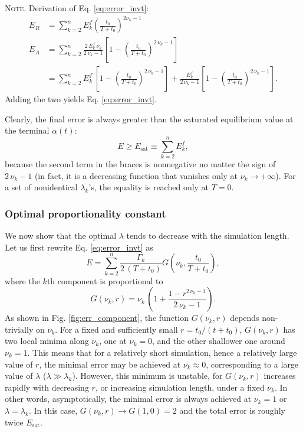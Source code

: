 \documentclass[reprint, floatfix]{revtex4-1}
\newcommand{\note}[1]{{\color{DarkGreen}\footnotesize \textsc{Note.} #1}}
\newcommand{\Err}{E}
\begin{document}
\note{Derivation of Eq. \eqref{eq:error_invt}:
$$
\begin{aligned}
\Err_R
&=
\sum_{ k = 2 }^n
  \Err^f_k \left( \frac{   t_0   }
                       { T + t_0 }
          \right)^{ 2 \nu_k - 1 }
\\
\Err_A
&=
\sum_{ k = 2 }^n
  \frac{ 2 \, \Err^f_k \, \nu_k }
       {    2 \, \nu_k - 1      }
  \left[
    1 -
    \left(
      \tfrac{   t_0   }
            { T + t_0 }
      \right)^{2 \, \nu_k - 1}
  \right]
\\
&=
\sum_{ k = 2 }^n
  \Err^f_k \,
  \left[
    1 -
    \left(
      \tfrac{   t_0   }
            { T + t_0 }
      \right)^{2 \, \nu_k - 1}
  \right]
  +
  \frac{   \Err^f_k     }
       { 2 \, \nu_k - 1 }
  \left[
    1 -
    \left(
      \tfrac{   t_0   }
           { T + t_0 }
      \right)^{2 \, \nu_k - 1}
  \right].
\end{aligned}
$$
Adding the two yields Eq. \eqref{eq:error_invt}.
}



%

Clearly, the final error is always greater than
the saturated equilibrium value at the terminal $\alpha(t)$:
$$
E \ge E_\mathrm{sat} \equiv \sum_{k = 2}^n E^f_k,
$$
because the second term in the braces
is nonnegative no matter the sign of $2 \, \nu_k - 1$
(in fact, it is a decreasing function
that vanishes only at $\nu_k \to +\infty$).
%
For a set of nonidentical $\lambda_k$'s,
the equality is reached only at $T = 0$.



\subsubsection{\label{sec:optlambda}
Optimal proportionality constant}



We now show that the optimal $\lambda$
tends to decrease with the simulation length.
%
Let us first rewrite Eq. \eqref{eq:error_invt} as
%
$$
\Err
=
\sum_{ k = 2 }^n
  \frac{    \Gamma_k    }
       { 2 \, (T + t_0) }
  G\left( \nu_k, \frac{ t_0 } { T + t_0} \right),
$$
%
where the $k$th component is proportional to
%
$$
G\left( \nu_k, r \right)
=
\nu_k
\,
\left(
  1
  +
  \frac{ 1 - r^{2 \, \nu_k - 1} }
       {   2 \, \nu_k - 1       }
\right).
$$
%
As shown in Fig. \ref{fig:err_component},
the function $G(\nu_k, r)$ depends non-trivially on $\nu_k$.
%
For a fixed and sufficiently small $r = t_0 / (t + t_0)$,
$G(\nu_k, r)$ has two local minima along $\nu_k$,
one at $\nu_k = 0$,
and the other shallower one around $\nu_k = 1$.
%
This means that for a relatively short simulation,
hence a relatively large value of $r$,
the minimal error may be achieved at $\nu_k \approx 0$,
corresponding to a large value of $\lambda$
($\lambda \gg \lambda_k$).
%
However, this minimum is unstable,
for $G(\nu_k, r)$ increases rapidly
with decreasing $r$, or increasing simulation length,
under a fixed $\nu_k$.
%
In other words,
asymptotically, the minimal error is always achieved at
$\nu_k = 1$ or $\lambda = \lambda_k$.
%
In this case,
$G(\nu_k, r) \to G(1, 0) = 2$
and the total error is roughly twice $E_\mathrm{sat}$.
\end{document}

